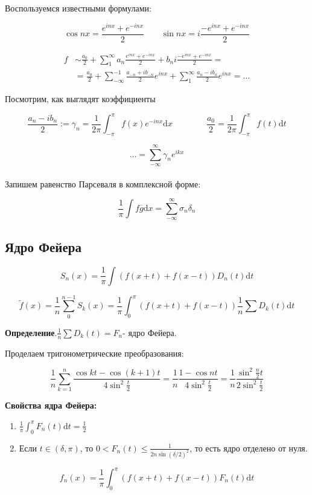 \documentclass[12pt]{article}
\newcommand{\dd}{\ensuremath{\mathrm{d}}}
\begin{document}
Воспользуемся известными формулами:

$$\cos{nx} = \frac{e^{inx} + e^{-inx}}{2} \qquad \sin{nx} = i \frac{-e^{inx} + e^{-inx}}{2}$$

\vspace{1em}

\begin{align*} 
    f & \sim \frac{a_0}{2} + \sum_{1}^{\infty} a_n  \frac{e^{inx} + e^{-inx}}{2} + b_n i \frac{-e^{inx} + e^{-inx}}{2} = \\ 
    & = \frac{a_0}{2} + \sum_{-\infty}^{-1} \frac{a_{-n} + ib_{-n}}{2}e^{inx} + \sum_{1}^{\infty} \frac{a_n-ib_n}{2}e^{inx} = \dots
\end{align*}

Посмотрим, как выглядят коэффициенты

$$\frac{a_n-ib_n}{2} := \gamma_n = \frac{1}{2\pi} \int_{-\pi}^{\pi} f(x) e^{-inx} \dd x \hspace{4em} \frac{a_0}{2} = \frac{1}{2\pi} \int_{-\pi}^{\pi} f(t) \dd t$$

$$ \dots = \sum_{-\infty}^{\infty} \gamma_n e^{ikx}$$

\paragraph{}

Запишем равенство Парсеваля в комплексной форме:

$$ \frac{1}{\pi} \int f \overline{g} \dd x = \sum_{-\infty}^{\infty} \sigma_n \delta_n$$

\subsection{Ядро Фейера}

\[
S_{n}(x)=\frac{1}{\pi}\int(f(x+t)+f(x-t))D_{n}(t)\mathrm{d}t
\]


\[
\tilde{f}(x)=\frac{1}{n}\sum_{0}^{n-1}S_{k}(x)=\frac{1}{\pi}\int_{0}^{\pi}(f(x+t)+f(x-t))\frac{1}{n}\sum D_{k}(t)\mathrm{d}t
\]


\textbf{Определение}.$\frac{1}{n}\sum D_{k}(t)=F_{n}$- ядро Фейера.

Проделаем тригонометрические преобразования:

\[
\frac{1}{n}\sum_{k=1}^{n}\frac{\cos kt-\cos(k+1)t}{4\sin^{2}\frac{t}{2}}=\frac{1}{n}\frac{1-\cos nt}{4\sin^{2}\frac{t}{2}}=\frac{1}{n}\frac{\sin^{2}\frac{n}{2}t}{2\sin^{2}\frac{t}{2}}
\]


\vline

\textbf{Свойства ядра Фейера:}
\begin{enumerate}

\item $\frac{1}{\pi}\int_{0}^{\pi}F_{n}(t)\mathrm{d}t=\frac{1}{2}$
\item Если $t\in(\delta,\pi)$, то $0<F_{n}(t)\le\frac{1}{2n\sin(\delta/2)^{2}}$,
то есть ядро отделено от нуля.
\end{enumerate}
\[
f_{n}(x)=\frac{1}{\pi}\int_{0}^{\pi}(f(x+t)+f(x-t))F_{n}(t)\mathrm{d}t
\]
\end{document}
